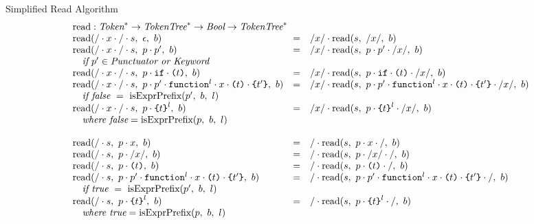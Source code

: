 \documentclass[onecolumn]{sigplanconf-onecolumn}
\begin{document}
\begin{displayfigure*}{\label{fig:simpleread}Simplified Read Algorithm}
\[\begin{array}{lcll}
    \multicolumn{3}{l}{\textrm{read} : \Tok^{*} \rightarrow \TT^{*}
      \rightarrow \textit{Bool} \rightarrow \TT^{*}}
    \\
    \readfn{/\cdot x \cdot /\cdot \vtok}{\epsilon}{b}
    &=&
    \cons{/x/}{
      \readfn{\vtok}{/x/}{b}
    }
    \\
    \readfn{/\cdot x \cdot /\cdot \vtok}{p \cdot p'}{b}
    &=&
    \cons{/x/}{
      \readfn{\vtok}{
        p \cdot p' \cdot /x/
      }{b}
    }
    \\
    \quad\textit{if}~p' \in \textit{Punctuator or Keyword}
    \\
    \readfn{/\cdot x \cdot /\cdot \vtok}{
      p \cdot \texttt{if} \cdot \parens{t}
    }{b}
    &=&
    \cons{/x/}{
      \readfn{\vtok}{p \cdot \texttt{if} \cdot \parens{t} \cdot /x/}{b}
    }
    \\
    \readfn{/\cdot x \cdot /\cdot \vtok}{
      p \cdot p' \cdot \texttt{function}^{l} \cdot x
      \cdot \parens{t} \cdot \curlies{t'}
    }{b}
    &=&
    \cons{/x/}{
      \readfn{\vtok}{
      p \cdot p' 
      \cdot \texttt{function}^{l} \cdot x \cdot 
      \parens{t} \cdot \curlies{t'}\cdot /x/
      }{b}
    } \\
    \quad \textit{if false}~=~ \isobject(p',~b,~l)
    \\
    \readfn{/\cdot x \cdot / \cdot \vtok}{
      p \cdot \curlies{t}^{l}
    }{b}
    &=&
    \cons{/x/}{
      \readfn{\vtok}{
        p \cdot \curlies{t}^{l}\cdot /x/
      }{b}
    }
    \\
    \quad \textit{where false} = \isobject(p,~b,~l)

    \\ \\

    \readfn{/\cdot \vtok}{p\cdot x}{b}
    &=&
    \cons{/}{
      \readfn{\vtok}{
        p\cdot x\cdot /
      }{b}
    }
    \\
    \readfn{/\cdot \vtok}{p \cdot /x/}{b}
    &=&
    \cons{/}{
      \readfn{\vtok}{
        p \cdot /x/ \cdot /
      }{b}
    }
    \\
    \readfn{/\cdot \vtok}{p \cdot \parens{t}}{b}
    &=&
    \cons{/}{
      \readfn{\vtok}{
        p \cdot \parens{t} \cdot /
      }{b}
    }
    \\
    \readfn{/\cdot \vtok}{
      p \cdot p' \cdot \texttt{function}^l \cdot x
      \cdot \parens{t} \cdot \curlies{t'}
    }{b}
    &=&
    \cons{/}{
      \readfn{\vtok}{
        p \cdot p' \cdot \texttt{function}^l \cdot x \cdot \parens{t}
        \cdot \curlies{t'} \cdot /
      }{b}
    }
    \\
    \quad \textit{if true}~=~\isobject(p',~b,~l)
    \\
    \readfn{/\cdot \vtok}{
      p \cdot \curlies{t}^{l}
    }{b}
    &=&
    \cons{/}{
      \readfn{\vtok}{
        p \cdot \curlies{t}^{l} \cdot /
      }{b}
    }
    \\
    \quad \textit{where true} = \isobject(p,~b,~l)


\end{array}\]
\end{displayfigure*}
\end{document}
